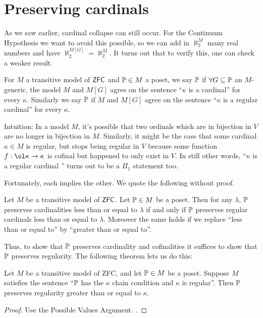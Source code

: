 \section{Preserving cardinals}
As we saw earlier, cardinal collapse can still occur.
For the Continuum Hypothesis we want to avoid this possible,
so we can add in $\aleph_2^M$ many real numbers and have $\aleph_2^{M[G]} = \aleph_2^M$.
It turns out that to verify this, one can check a weaker result.

\begin{definition}
	For $M$ a transitive model of $\mathsf{ZFC}$ and $\mathbb P \in M$ a poset,
	we say $\mathbb P$  if
	$\forall G \subseteq \mathbb P$ an $M$-generic,
	the model $M$ and $M[G]$ agree on the sentence ``$\kappa$ is a cardinal'' for every $\kappa$.
	Similarly we say $\mathbb P$  if $M$ and $M[G]$
	agree on the sentence ``$\kappa$ is a regular cardinal'' for every $\kappa$.
\end{definition}
Intuition:
In a model $M$, it's possible that two ordinals which are in bijection in $V$ are no longer in bijection in $M$.
Similarly, it might be the case that some cardinal $\kappa \in M$ is regular,
but stops being regular in $V$ because some function $f : \ol\kappa \to \kappa$ is cofinal but happened to only exist in $V$.
In still other words, ``$\kappa$ is a regular cardinal '' turns out to be a $\Pi_1$ statement too.

Fortunately, each implies the other.
We quote the following without proof.
\begin{proposition}
	Let $M$ be a transitive model of $\mathsf{ZFC}$.
	Let $\mathbb P \in M$ be a poset.
	Then for any $\lambda$,
		$\mathbb P$ preserves cardinalities less than or equal to $\lambda$
		if and only if $\mathbb P$ preserves regular cardinals less than or equal to $\lambda$.
	Moreover the same holds if we replace ``less than or equal to''
	by ``greater than or equal to''.
\end{proposition}

Thus, to show that $\mathbb P$ preserves cardinality and cofinalities it suffices to show that $\mathbb P$ preserves regularity.
The following theorem lets us do this:
\begin{theorem}
	Let $M$ be a transitive model of ZFC, and let $\mathbb P \in M$ be a poset.
	Suppose $M$ satisfies the sentence ``$\mathbb P$ has the $\kappa$ chain condition and $\kappa$ is regular''.
	Then $\mathbb P$ preserves regularity greater than or equal to $\kappa$.
\end{theorem}
\begin{proof}
	Use the Possible Values Argument.
	.
\end{proof}

